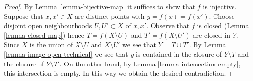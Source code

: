 \documentclass[10pt,a4paper]{amsart}
\theoremstyle{plain}
\theoremstyle{definition}
\theoremstyle{remark}
\numberwithin{equation}{subsection}
\begin{document}
\begin{proof}
By Lemma \ref{lemma-bijective-map} it suffices to show that $f$ is injective.
Suppose that $x, x' \in X$ are distinct points with $y = f(x) = f(x')$.
Choose disjoint open neighbourhoods $U, U' \subset X$ of $x, x'$.
Observe that $f$ is closed (Lemma \ref{lemma-closed-map}) hence
$T = f(X \setminus U)$ and $T' = f(X \setminus U')$ are closed in $Y$.
Since $X$ is the union of $X \setminus U$ and $X \setminus U'$ we see that
$Y = T \cup T'$. By Lemma \ref{lemma-image-open-technical} we
see that $y$ is contained in the closure of $Y \setminus T$ and
the closure of $Y \setminus T'$. On the other hand, by
Lemma \ref{lemma-intersection-empty},
this intersection is empty. In this way we obtain the desired contradiction.
\end{proof}
\end{document}
